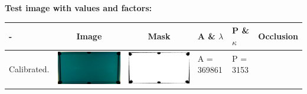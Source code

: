 \textbf{Test image with values and factors:}\\
\begin{tabular}{|l|c|c|l|l|c|}
\hline - & Image & Mask & A \& $\lambda$ & P \& $\kappa$ & Occlusion \\ 
\hline

\multirow{4}{*}{Calibrated.} & \multirow{4}{*}{\includegraphics[scale=0.1]{../images/1/calibimg.png}} & \multirow{4}{*}{\includegraphics[scale=0.1]{../images/1/calibmask.png}} & A = 369861 & P = 3153  & \multirow{4}{*}{}\\  
& & & & & \\
&&&&&\\
&&&&&\\
\hline


\end{tabular}
